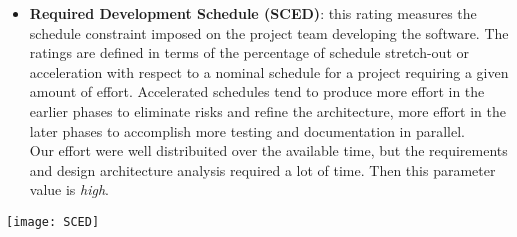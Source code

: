\begin{itemize}
	\item \textbf{Required Development Schedule (SCED)}: this rating measures the schedule constraint imposed on the project team developing the software. The ratings are defined in terms of the percentage of schedule stretch-out or acceleration with respect to a nominal schedule for a project requiring a given amount of effort. Accelerated schedules tend to produce more effort in the earlier phases to eliminate risks and refine the architecture, more effort in the later phases to accomplish more testing and
	documentation in parallel. \\ Our effort were well distribuited over the available time, but the requirements and design architecture analysis required a lot of time. Then this parameter value is \textit{high}.
\end{itemize}
\begin{center}
	\texttt{[image: SCED]}
\end{center}

